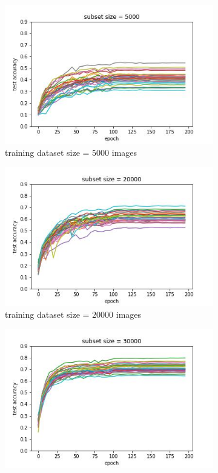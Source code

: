 \documentclass{article} %
\begin{document}
\begin{figure}
    \begin{subfigure}{.5\textwidth}
      \centering
      \includegraphics[width=.8\linewidth]{test_acc_vs_epoch_subset_size_5000}
      \caption{training dataset size = $5000$ images}
      \label{fig:subsetsize5000}
    \end{subfigure}%
    \begin{subfigure}{.5\textwidth}
      \centering
      \includegraphics[width=.8\linewidth]{test_acc_vs_epoch_subset_size_20000}
      \caption{training dataset size = $20000$ images}
      \label{fig:subsetsize20000}
    \end{subfigure}
    \begin{subfigure}{.5\textwidth}
        \centering
        \includegraphics[width=.8\linewidth]{test_acc_vs_epoch_subset_size_30000}

\end{subfigure}
\end{figure}
\end{document}
